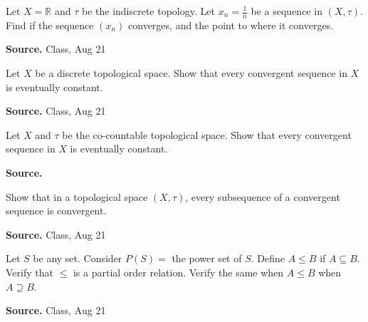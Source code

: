 \documentclass[12pt,twoside]{report}
\newenvironment*{source}{\hfill\scriptsize\textbf{Source.}\space}{\par}
\begin{document}
\begin{samepage}
\begin{ex}
Let $X = \mathbb{R}$ and $\tau$ be the indiscrete topology. 
Let $x_n = \frac{1}{n}$ be a sequence in $\left (X, \tau\right )$.
Find if the sequence $\left (x_n\right )$ converges, and the point to where it converges.
\end{ex}
\begin{source}
Class, Aug 21
\end{source}
\end{samepage}

\begin{samepage}
\begin{ex}
Let $X$ be a discrete topological space. Show that every convergent sequence in $X$ is eventually constant.
\end{ex}
\begin{source}
Class, Aug 21
\end{source}
\end{samepage}

\begin{samepage}
\begin{ex}
Let $X$ and $\tau$ be the co-countable topological space. Show that every convergent sequence in $X$ is eventually constant.
\end{ex}
\begin{source}
\end{source}
\end{samepage}

\begin{samepage}
\begin{ex}
Show that in a topological space $\left (X, \tau\right )$, every subsequence of a convergent sequence is convergent.
\end{ex}
\begin{source}
Class, Aug 21
\end{source}
\end{samepage}

\begin{samepage}
\begin{ex}
Let $S$ be any set. Consider $P\left (S\right ) = $ the power set of $S$. Define $A \leq B$ if $A \subseteq B$. Verify that $\leq$ is a partial order relation.
Verify the same when $A \leq B$ when $A \supseteq B$.
\end{ex}
\begin{source}
Class, Aug 21
\end{source}
\end{samepage}
\end{document}
